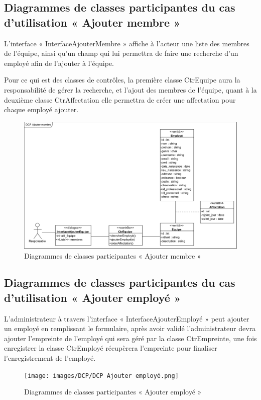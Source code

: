 \begin{itemize}
        \subsection*{Diagrammes de classes participantes du cas d'utilisation « Ajouter membre »}
        L’interface « InterfaceAjouterMembre » affiche à l’acteur une liste des membres de l’équipe, ainsi qu’un champ qui lui permettra de faire une recherche d’un employé afin de l’ajouter à l’équipe.
        
        Pour ce qui est des classes de contrôles, la première classe CtrEquipe aura la responsabilité de gérer la recherche, et l’ajout des membres de l’équipe, quant à la deuxième classe CtrAffectation elle permettra de créer une affectation pour chaque employé ajouter.
        \clearpage
            \begin{figure}[h!]
                 \centering
                \includegraphics[scale=0.72]{images/DCP/DCP Ajouter membre.png}
                 \caption{Diagrammes de classes participantes « Ajouter membre »}
                 \label{fig30}
            \end{figure}
            
        \subsection*{Diagrammes de classes participantes du cas d'utilisation « Ajouter employé »}
        L’administrateur à travers l’interface « InterfaceAjouterEmployé » peut ajouter un employé en remplissant le formulaire, après avoir validé l’administrateur devra ajouter l’empreinte de l’employé qui sera géré par la classe CtrEmpreinte, une fois enregistrer la classe CtrEmployé récupèrera l’empreinte pour finaliser l’enregistrement de l’employé. 
        \clearpage
            \begin{figure}[h!]
                 \centering
                \texttt{[image: images/DCP/DCP Ajouter employé.png]}
                 \caption{Diagrammes de classes participantes « Ajouter employé »}
                 \label{fig31}
            \end{figure}
        

\end{itemize}
